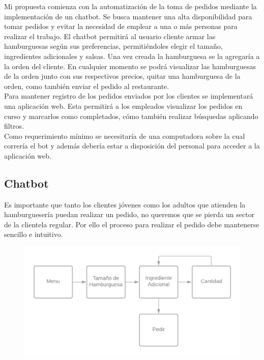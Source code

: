 \documentclass[a4paper,12pt]{article}
\begin{document}
Mi propuesta comienza con la automatización de la toma de pedidos mediante la implementación de un chatbot. Se busca mantener una alta disponibilidad para tomar pedidos y evitar la necesidad de emplear a una o más personas para realizar el trabajo.
El chatbot permitirá al usuario cliente armar las hamburguesas según sus preferencias, permitiéndoles elegir el tamaño, ingredientes adicionales y salsas. Una vez creada la hamburguesa se la agregaría a la orden del cliente. En cualquier momento se podrá visualizar las hamburguesas de la orden junto con sus respectivos precios,  quitar una hamburguesa de la orden, como también enviar el pedido al restaurante. 
\\
Para mantener registro de los pedidos enviados por los clientes se implementará una aplicación web. Esta permitirá a los empleados visualizar los pedidos en curso y marcarlos como completados, cómo también realizar búsquedas aplicando filtros. 
\\
Como requerimiento mínimo se necesitaría de una computadora sobre la cual correría el bot y además debería estar a disposición del personal para acceder a la aplicación web.

\pagebreak

\subsection{Chatbot}
Es importante que tanto los clientes jóvenes como los adultos que atienden la hamburguesería puedan realizar un pedido, no queremos que se pierda un sector de la clientela regular. Por ello el proceso para realizar el pedido debe mantenerse sencillo e intuitivo.

\begin{figure}[H]
	\centering
	\includegraphics[width=1.0\linewidth]{diagrama-flujo.png}
\end{figure}
\end{document}
